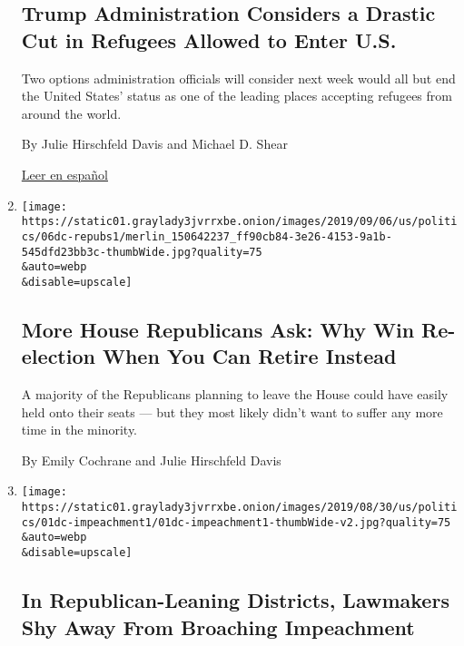 \begin{enumerate}
  \hypertarget{trump-administration-considers-a-drastic-cut-in-refugees-allowed-to-enter-us}{%
  \subsection{Trump Administration Considers a Drastic Cut in Refugees
  Allowed to Enter
  U.S.}\label{trump-administration-considers-a-drastic-cut-in-refugees-allowed-to-enter-us}}

  Two options administration officials will consider next week would all
  but end the United States' status as one of the leading places
  accepting refugees from around the world.

  By Julie Hirschfeld Davis and Michael D. Shear

  \href{https://www.nytimes3xbfgragh.onion/es/2019/09/09/espanol/mundo/trump-refugiados-recorte.html}{Leer
  en español}
\item
  \href{/2019/09/06/us/politics/house-republicans-retire.html}{}

  \texttt{[image: https://static01.graylady3jvrrxbe.onion/images/2019/09/06/us/politics/06dc-repubs1/merlin\_150642237\_ff90cb84-3e26-4153-9a1b-545dfd23bb3c-thumbWide.jpg?quality=75\\\&auto=webp\\\&disable=upscale]}

  \hypertarget{more-house-republicans-ask-why-win-re-election-when-you-can-retire-instead}{%
  \subsection{More House Republicans Ask: Why Win Re-election When You
  Can Retire
  Instead}\label{more-house-republicans-ask-why-win-re-election-when-you-can-retire-instead}}

  A majority of the Republicans planning to leave the House could have
  easily held onto their seats --- but they most likely didn't want to
  suffer any more time in the minority.

  By Emily Cochrane and Julie Hirschfeld Davis
\item
  \href{/2019/09/01/us/politics/house-democrats-impeachment.html}{}

  \texttt{[image: https://static01.graylady3jvrrxbe.onion/images/2019/08/30/us/politics/01dc-impeachment1/01dc-impeachment1-thumbWide-v2.jpg?quality=75\\\&auto=webp\\\&disable=upscale]}

  \hypertarget{in-republican-leaning-districts-lawmakers-shy-away-from-broaching-impeachment}{%
  \subsection{In Republican-Leaning Districts, Lawmakers Shy Away From
  Broaching
  Impeachment}\label{in-republican-leaning-districts-lawmakers-shy-away-from-broaching-impeachment}}


\end{enumerate}
